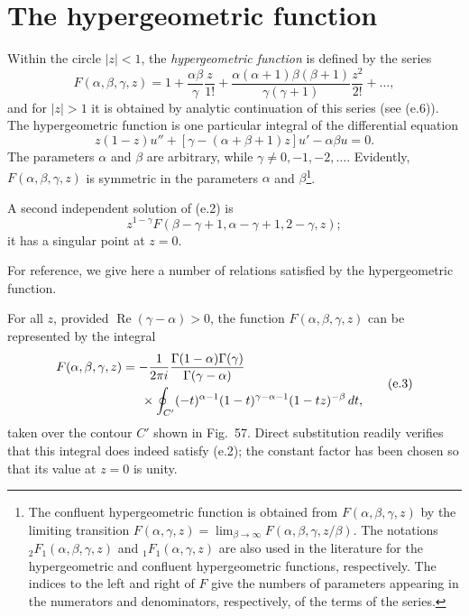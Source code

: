 \renewcommand{\thesection}{\alph{section}}
\setcounter{section}{4}
\section{The hypergeometric function}

Within the circle $|z|<1$, the \emph{hypergeometric function} is defined by
the series
\begin{equation}
 F(\alpha,\beta,\gamma,z)=1+\frac{\alpha\beta}{\gamma}\frac z{1!}
 +\frac{\alpha(\alpha+1)\beta(\beta+1)}{\gamma(\gamma+1)}
 \frac{z^2}{2!}+\ldots,
 \tag{e.1}
\end{equation}
and for $|z|>1$ it is obtained by analytic continuation of this series (see
(e.6)). The hypergeometric function is one particular integral of the
differential equation
\begin{equation}
 z(1-z)u''+[\gamma-(\alpha+\beta+1)z]u'-\alpha\beta u=0.
 \tag{e.2}
\end{equation}
The parameters $\alpha$ and $\beta$ are arbitrary, while
$\gamma\ne0,-1,-2,\ldots$. Evidently, $F(\alpha,\beta,\gamma,z)$ is symmetric
in the parameters $\alpha$ and $\beta$\footnote{The confluent hypergeometric
function is obtained from $F(\alpha,\beta,\gamma,z)$ by the limiting
transition
$F(\alpha,\gamma,z)=\lim_{\beta\to\infty}
F(\alpha,\beta,\gamma,z/\beta)$. The notations
${}_2F_1(\alpha,\beta,\gamma,z)$ and ${}_1F_1(\alpha,\gamma,z)$ are also used
in the literature for the hypergeometric and confluent hypergeometric
functions, respectively. The indices to the left and right of $F$ give the
numbers of parameters appearing in the numerators and denominators,
respectively, of the terms of the series.}.

A second independent solution of (e.2) is
\[
 z^{1-\gamma}F(\beta-\gamma+1,\alpha-\gamma+1,2-\gamma,z);
\]
it has a singular point at $z=0$.

For reference, we give here a number of relations satisfied by the
hypergeometric function.

For all $z$, provided $\operatorname{Re}(\gamma-\alpha)>0$, the function
$F(\alpha,\beta,\gamma,z)$ can be represented by the integral
\begin{equation}
 \begin{split}
 F(\alpha,\beta,\gamma,z)
 &=-\frac1{2\pi i}
 \frac{\Gamma(1-\alpha)\Gamma(\gamma)}{\Gamma(\gamma-\alpha)}\\
 &\hspace{1.5em}\times\oint_{C'}(-t)^{\alpha-1}
 (1-t)^{\gamma-\alpha-1}(1-tz)^{-\beta}\,dt,
 \end{split}
 \tag{e.3}
\end{equation}
taken over the contour $C'$ shown in Fig.~57. Direct substitution readily
verifies that this integral does indeed satisfy (e.2); the constant factor has
been chosen so that its value at $z=0$ is unity.

